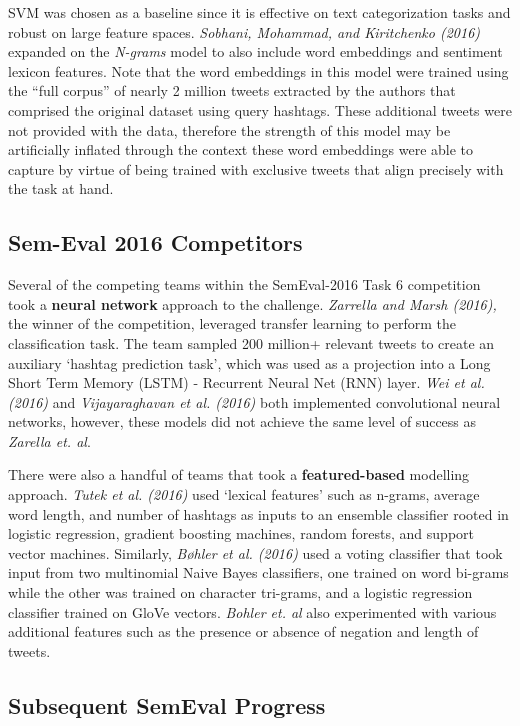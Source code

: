 \documentclass[]{article}
\begin{document}
SVM was chosen as a baseline since it is effective on text
categorization tasks and robust on large feature spaces. \emph{Sobhani,
Mohammad, and Kiritchenko (2016) } expanded on the \emph{N-grams} model
to also include word embeddings and sentiment lexicon features. Note
that the word embeddings in this model were trained using the ``full
corpus'' of nearly 2 million tweets extracted by the authors that
comprised the original dataset using query hashtags. These additional
tweets were not provided with the data, therefore the strength of this
model may be artificially inflated through the context these word
embeddings were able to capture by virtue of being trained with
exclusive tweets that align precisely with the task at hand.

\hypertarget{sem-eval-2016-competitors}{%
\subsection{Sem-Eval 2016 Competitors}\label{sem-eval-2016-competitors}}

Several of the competing teams within the SemEval-2016 Task 6
competition took a \textbf{neural network} approach to the challenge.
\emph{Zarrella and Marsh (2016),} the winner of the competition,
leveraged transfer learning to perform the classification task. The team
sampled 200 million+ relevant tweets to create an auxiliary `hashtag
prediction task', which was used as a projection into a Long Short Term
Memory (LSTM) - Recurrent Neural Net (RNN) layer. \emph{Wei et al.
(2016) } and \emph{Vijayaraghavan et al. (2016) } both implemented
convolutional neural networks, however, these models did not achieve the
same level of success as \emph{Zarella et. al}.

There were also a handful of teams that took a \textbf{featured-based}
modelling approach. \emph{Tutek et al. (2016) } used `lexical features'
such as n-grams, average word length, and number of hashtags as inputs
to an ensemble classifier rooted in logistic regression, gradient
boosting machines, random forests, and support vector machines.
Similarly, \emph{Bøhler et al. (2016) } used a voting classifier that
took input from two multinomial Naive Bayes classifiers, one trained on
word bi-grams while the other was trained on character tri-grams, and a
logistic regression classifier trained on GloVe vectors. \emph{Bohler
et. al} also experimented with various additional features such as the
presence or absence of negation and length of tweets.

\hypertarget{subsequent-semeval-progress}{%
\subsection{Subsequent SemEval
Progress}\label{subsequent-semeval-progress}}
\end{document}
